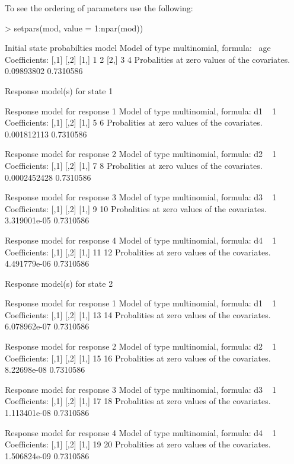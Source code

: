 \documentclass[article]{jss}
\begin{document}
To see the ordering of parameters use the following:
\begin{Schunk}
\begin{Sinput}
> setpars(mod, value = 1:npar(mod))
\end{Sinput}
\begin{Soutput}
Initial state probabilties model 
Model of type multinomial, formula: ~age
Coefficients: 
     [,1] [,2]
[1,]    1    2
[2,]    3    4
Probalities at zero values of the covariates.
0.09893802 0.7310586 

Response model(s) for state 1 

Response model for response 1 
Model of type multinomial, formula: d1 ~ 1
Coefficients: 
     [,1] [,2]
[1,]    5    6
Probalities at zero values of the covariates.
0.001812113 0.7310586 

Response model for response 2 
Model of type multinomial, formula: d2 ~ 1
Coefficients: 
     [,1] [,2]
[1,]    7    8
Probalities at zero values of the covariates.
0.0002452428 0.7310586 

Response model for response 3 
Model of type multinomial, formula: d3 ~ 1
Coefficients: 
     [,1] [,2]
[1,]    9   10
Probalities at zero values of the covariates.
3.319001e-05 0.7310586 

Response model for response 4 
Model of type multinomial, formula: d4 ~ 1
Coefficients: 
     [,1] [,2]
[1,]   11   12
Probalities at zero values of the covariates.
4.491779e-06 0.7310586 


Response model(s) for state 2 

Response model for response 1 
Model of type multinomial, formula: d1 ~ 1
Coefficients: 
     [,1] [,2]
[1,]   13   14
Probalities at zero values of the covariates.
6.078962e-07 0.7310586 

Response model for response 2 
Model of type multinomial, formula: d2 ~ 1
Coefficients: 
     [,1] [,2]
[1,]   15   16
Probalities at zero values of the covariates.
8.22698e-08 0.7310586 

Response model for response 3 
Model of type multinomial, formula: d3 ~ 1
Coefficients: 
     [,1] [,2]
[1,]   17   18
Probalities at zero values of the covariates.
1.113401e-08 0.7310586 

Response model for response 4 
Model of type multinomial, formula: d4 ~ 1
Coefficients: 
     [,1] [,2]
[1,]   19   20
Probalities at zero values of the covariates.
1.506824e-09 0.7310586 
\end{Soutput}
\end{Schunk}
\end{document}
